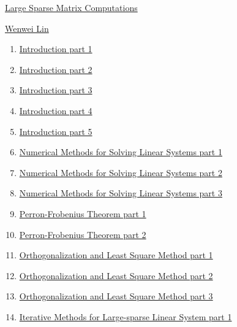 \documentclass[11pt]{article}
\begin{document}
\kaishu 
\setcounter{section}{0}
\begin{center}
	{\LARGE  \href{https://www.youtube.com/playlist?list=PLbWe7cQA0ts_7qCp_7GlCmQZA5jk27lQ_}{Large Sparse Matrix Computations}}
		
	{\large \href{https://sites.google.com/g2.nctu.edu.tw/wwlin}{Wenwei Lin}}
\end{center}

\setcounter{page}{1}

\vspace{-1cm}

\begin{enumerate}
	\item \href{https://mp.weixin.qq.com/s/CTN5mKkKTuuAFY1u0Vsigw}{Introduction part 1}	%
	\item \href{https://mp.weixin.qq.com/s/UNCJbtdwgFIdUq1prH4c-Q}{Introduction part 2}	%
	\item \href{https://mp.weixin.qq.com/s/hASyc0GdgCLgO1ssOMxtcQ}{Introduction part 3}	%
	\item \href{https://mp.weixin.qq.com/s/pCrzbKd1qRBDvHyb8ir_DA}{Introduction part 4}	%
	\item \href{https://mp.weixin.qq.com/s/_zFbJcPUXhL0acIXFuOOzQ}{Introduction part 5}	%
	\item \href{https://mp.weixin.qq.com/s/FPWxQQrZXztVNImlWMYpHg}{Numerical Methods for Solving Linear Systems part 1}	%
	\item \href{https://mp.weixin.qq.com/s/0OezkzsGHUqado4drZysMA}{Numerical Methods for Solving Linear Systems part 2}	%
	\item \href{https://mp.weixin.qq.com/s/YrJnjHdO6rb6nK0AHwzLJw}{Numerical Methods for Solving Linear Systems part 3}	%
	\item \href{https://mp.weixin.qq.com/s/M_75wxaFrus7lcxitJEbag}{Perron-Frobenius Theorem part 1}	%
	\item \href{https://mp.weixin.qq.com/s/AT3aA34TefGtxqZREMp9jw}{Perron-Frobenius Theorem part 2}	%
	\item \href{https://mp.weixin.qq.com/s/_QVdyULnMO8bjWVEryjeqw}{Orthogonalization and Least Square Method part 1}	%
	\item \href{https://mp.weixin.qq.com/s/CkxDvn2pGCgPuOpet_M4gQ}{Orthogonalization and Least Square Method part 2}	%
	\item \href{https://mp.weixin.qq.com/s/3E5ewyDKiG9mU-LZwyrfHQ}{Orthogonalization and Least Square Method part 3}	%
	\item \href{https://mp.weixin.qq.com/s/jF9Q9m3crGechalVnrgeSw}{Iterative Methods for Large-sparse Linear System part 1}	%

\end{enumerate}
\end{document}
